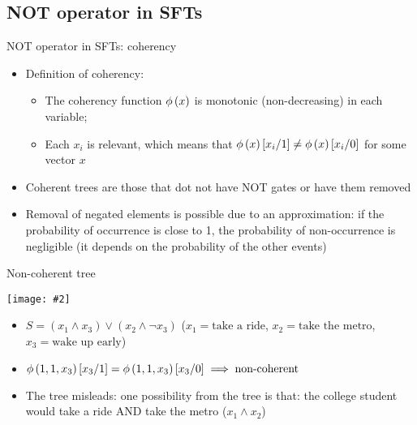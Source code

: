 \documentclass{beamer}
\newcommand{\includegraphicsaspectratio}[2][1]{%
  \texttt{[image: \#2]}%
}
\def\ftcoherencyop{\ensuremath\operatorname{\phi}}
\newcommand{\ftcoherency}[1]{\ensuremath\ftcoherencyop\left(#1\right)}
\newcommand{\replace}[2]{\ensuremath\left[#1\middle/#2\right]}
\begin{document}
\subsection{NOT operator in SFTs}

\begin{frame}{NOT operator in SFTs: coherency}
	\begin{itemize}
		\item Definition of coherency:
			\begin{itemize}
				\item The coherency function $\ftcoherency{x}$ is monotonic (non-decreasing) in each variable;
				\item Each $x_i$ is relevant, which means that $\ftcoherency{x}\replace{x_i}{1} \neq \ftcoherency{x}\replace{x_i}{0}$ for some vector $x$
			\end{itemize}
		\item Coherent trees are those that dot not have NOT gates or have them removed
		\item Removal of negated elements is possible due to an approximation: if the probability of occurrence is close to 1, the probability of non-occurrence is negligible (it depends on the probability of the other events)
	\end{itemize}
	
\end{frame}

\begin{frame}{Non-coherent tree}
	\begin{center}
		\includegraphicsaspectratio[0.50]{non-coherent-ft-example}\\
	\end{center}
	\footnotesize
	\begin{itemize}
		\item $S = \left(x_1 \land x_3\right) \lor \left(x_2 \land \lnot x_3\right)$ ($x_1 = \text{take a ride}$, $x_2 = \text{take the metro}$, $x_3 = \text{wake up early}$)
		\item $\ftcoherency{1,1,x_3}\replace{x_3}{1}=\ftcoherency{1,1,x_3}\replace{x_3}{0} \implies \text{non-coherent}$
		\item The tree misleads: one possibility from the tree is that: the college student would take a ride AND take the metro ($x_1 \land x_2$)
	\end{itemize}
\end{frame}
\end{document}
